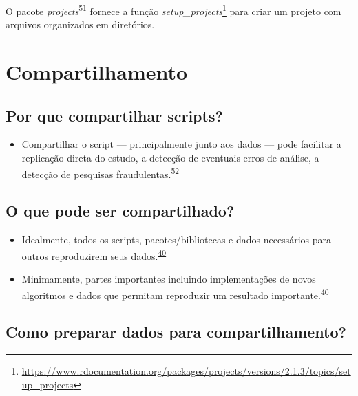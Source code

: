 \documentclass[
  a4paper,
]{book}
\providecommand{\tightlist}{%
  \setlength{\itemsep}{0pt}\setlength{\parskip}{0pt}}
\renewcommand{\href}[2]{#2\footnote{\url{#1}}}
\newenvironment{infobox}[1]
  {
  \begin{itemize}
  \renewcommand{\labelitemi}{
    \raisebox{-.7\height}[0pt][0pt]{
      {\setkeys{Gin}{width=3em,keepaspectratio}
        \texttt{[image: \#1]}}
    }
  }
  \setlength{\fboxsep}{1em}
  \begin{blackbox}
  \item
  }
  {
  \end{blackbox}
  \end{itemize}
  }
\begin{document}
\begin{infobox}{images/Rlogo}
O pacote \emph{projects}\textsuperscript{\protect\hyperlink{ref-projects}{51}} fornece a função \href{https://www.rdocumentation.org/packages/projects/versions/2.1.3/topics/setup_projects}{\emph{setup\_projects}} para criar um projeto com arquivos organizados em diretórios.

\end{infobox}

\hypertarget{compartilhamento}{%
\section{Compartilhamento}\label{compartilhamento}}

\hypertarget{por-que-compartilhar-scripts}{%
\subsection{Por que compartilhar scripts?}\label{por-que-compartilhar-scripts}}

\begin{itemize}
\tightlist
\item
  Compartilhar o script --- principalmente junto aos dados --- pode facilitar a replicação direta do estudo, a detecção de eventuais erros de análise, a detecção de pesquisas fraudulentas.\textsuperscript{\protect\hyperlink{ref-schultze2023}{52}}
\end{itemize}

\hypertarget{o-que-pode-ser-compartilhado}{%
\subsection{O que pode ser compartilhado?}\label{o-que-pode-ser-compartilhado}}

\begin{itemize}
\item
  Idealmente, todos os scripts, pacotes/bibliotecas e dados necessários para outros reproduzirem seus dados.\textsuperscript{\protect\hyperlink{ref-Eglen2017}{40}}
\item
  Minimamente, partes importantes incluindo implementações de novos algoritmos e dados que permitam reproduzir um resultado importante.\textsuperscript{\protect\hyperlink{ref-Eglen2017}{40}}
\end{itemize}

\hypertarget{como-preparar-dados-para-compartilhamento}{%
\subsection{Como preparar dados para compartilhamento?}\label{como-preparar-dados-para-compartilhamento}}
\end{document}
